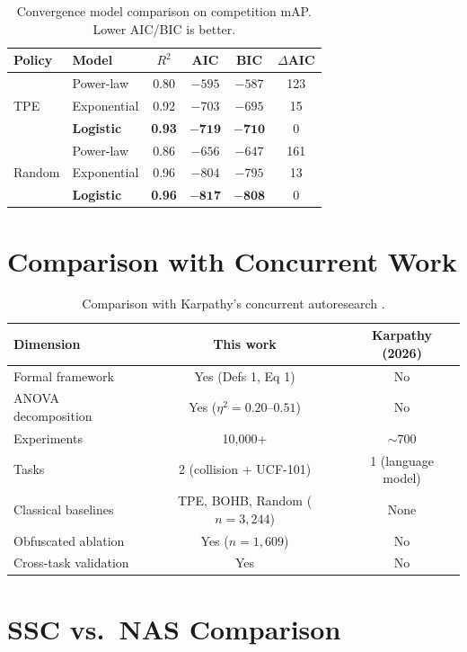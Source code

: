 \documentclass{article}
\begin{document}
\begin{table}[ht]
\centering
\caption{Convergence model comparison on competition mAP. Lower AIC/BIC is better.}
\label{tab:convergence_models}
\small
\begin{tabular}{@{}llcccc@{}}
\toprule
Policy & Model & $R^2$ & AIC & BIC & $\Delta$AIC \\
\midrule
\multirow{3}{*}{TPE}
& Power-law & 0.80 & $-595$ & $-587$ & 123 \\
& Exponential & 0.92 & $-703$ & $-695$ & 15 \\
& \textbf{Logistic} & \textbf{0.93} & $\mathbf{-719}$ & $\mathbf{-710}$ & 0 \\
\midrule
\multirow{3}{*}{Random}
& Power-law & 0.86 & $-656$ & $-647$ & 161 \\
& Exponential & 0.96 & $-804$ & $-795$ & 13 \\
& \textbf{Logistic} & \textbf{0.96} & $\mathbf{-817}$ & $\mathbf{-808}$ & 0 \\
\bottomrule
\end{tabular}
\end{table}


\section{Comparison with Concurrent Work}
\label{app:concurrent}

\begin{table}[ht]
\centering
\caption{Comparison with Karpathy's concurrent autoresearch \citep{karpathy2026autoresearch}.}
\small
\begin{tabular}{@{}lcc@{}}
\toprule
Dimension & This work & Karpathy (2026) \\
\midrule
Formal framework & Yes (Defs 1, Eq 1) & No \\
ANOVA decomposition & Yes ($\eta^2 = 0.20$--$0.51$) & No \\
Experiments & 10{,}000+ & $\sim$700 \\
Tasks & 2 (collision + UCF-101) & 1 (language model) \\
Classical baselines & TPE, BOHB, Random ($n = 3{,}244$) & None \\
Obfuscated ablation & Yes ($n = 1{,}609$) & No \\
Cross-task validation & Yes & No \\
\bottomrule
\end{tabular}
\end{table}


\section{SSC vs.\ NAS Comparison}
\label{app:ssc_vs_nas}
\end{document}

